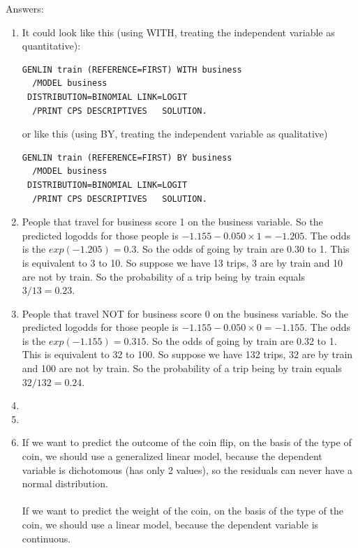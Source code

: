\documentclass[]{report}\usepackage[]{graphicx}\usepackage[]{color}
\begin{document}
Answers:
\begin{enumerate}


\item
It could look like this (using WITH, treating the independent variable as quantitative):

\begin{verbatim}
GENLIN train (REFERENCE=FIRST) WITH business
  /MODEL business
 DISTRIBUTION=BINOMIAL LINK=LOGIT
  /PRINT CPS DESCRIPTIVES   SOLUTION.
\end{verbatim}


or like this (using BY, treating the independent variable as qualitative)

\begin{verbatim}
GENLIN train (REFERENCE=FIRST) BY business
  /MODEL business
 DISTRIBUTION=BINOMIAL LINK=LOGIT
  /PRINT CPS DESCRIPTIVES   SOLUTION.
\end{verbatim}


\item
People that travel for business score 1 on the business variable. So the predicted logodds for those people is $-1.155 - 0.050 \times 1 = -1.205$. The odds is the $exp(-1.205)=0.3 $. So the odds of going by train are 0.30 to 1. This is equivalent to 3 to 10. So suppose we have 13 trips, 3 are by train and 10 are not by train. So the probability of a trip being by train equals $3/13=0.23$.

\item
People that travel NOT for business score 0 on the business variable. So the predicted logodds for those people is $-1.155 - 0.050 \times 0 = -1.155$. The odds is the $exp(-1.155)=0.315 $. So the odds of going by train are 0.32 to 1. This is equivalent to 32 to 100. So suppose we have 132 trips, 32 are by train and 100 are not by train. So the probability of a trip being by train equals $32/132=0.24$.

\item


\item

\item


If we want to predict the outcome of the coin flip, on the basis of the type of coin, we should use a generalized linear model, because the dependent variable is dichotomous (has only 2 values), so the residuals can never have a normal distribution.
\\
\\
If we want to predict the weight of the coin, on the basis of the type of the coin, we should use a linear model, because the dependent variable is continuous.


\end{enumerate}
\end{document}
